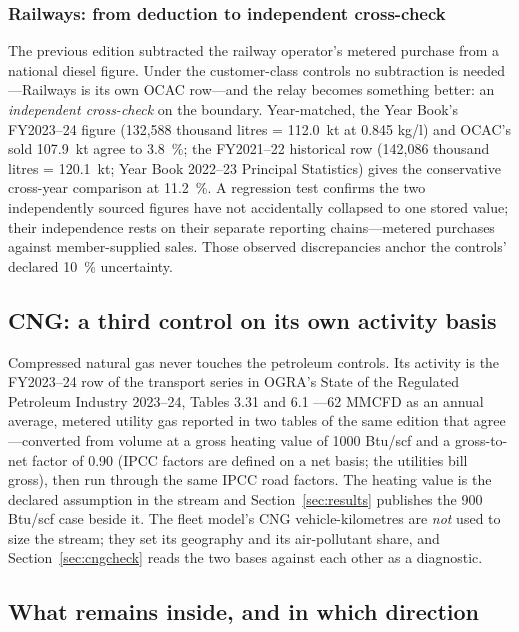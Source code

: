 \subsubsection{Railways: from deduction to independent cross-check}

The previous edition subtracted the railway operator's metered purchase
\citep{pakrailyearbook2024} from a national diesel figure. Under the customer-class
controls no subtraction is needed---Railways is its own OCAC row---and the relay becomes
something better: an \emph{independent cross-check} on the boundary. Year-matched, the
Year Book's FY2023--24 figure (132,588 thousand litres = \SI{112.0}{\kilo\tonne} at
0.845 kg/l) and OCAC's sold
\SI{107.9}{\kilo\tonne} agree to \SI{3.8}{\percent}; the FY2021--22 historical row
(142,086 thousand litres = \SI{120.1}{\kilo\tonne}; Year Book 2022--23 Principal
Statistics) gives the conservative cross-year comparison at
\SI{11.2}{\percent}. A regression test confirms the two independently sourced figures have
not accidentally collapsed to one stored value; their independence rests on their separate
reporting chains---metered purchases against member-supplied sales. Those observed
discrepancies anchor the controls' declared \SI{10}{\percent} uncertainty.

\subsection{CNG: a third control on its own activity basis}

Compressed natural gas never touches the petroleum controls. Its activity is the
FY2023--24 row of the transport series in OGRA's State of the Regulated Petroleum Industry
2023--24, Tables 3.31 and 6.1 \citep{ogra2024}---\SI{62}{} MMCFD as an annual average,
metered utility gas reported in two tables of the same edition that agree---converted from
volume at a gross
heating value of \SI{1000}{} Btu/scf \citep{sngpl2024,ssgc2024} and a gross-to-net factor
of \num{0.90} (IPCC factors are defined on a net basis; the utilities bill gross), then
run through the same IPCC road factors. The heating value is the declared assumption in
the stream and Section~\ref{sec:results} publishes the \SI{900}{} Btu/scf case beside it.
The fleet model's CNG vehicle-kilometres are \emph{not} used to size the stream; they set
its geography and its air-pollutant share, and Section~\ref{sec:cngcheck} reads the two
bases against each other as a diagnostic.

\subsection{What remains inside, and in which direction}

